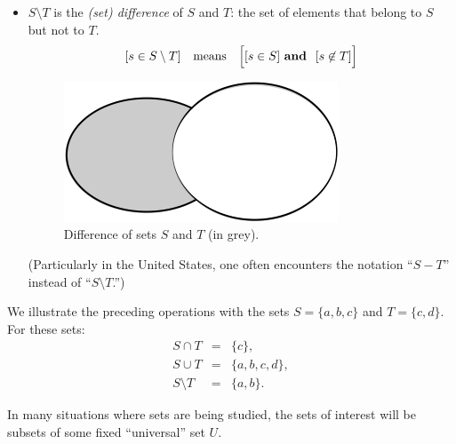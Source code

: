 \begin{itemize}
\begin{figure}[htb]
\begin{center}
        \label{fig:setUnion}
\end{center}
\end{figure}
\item
$S \setminus T$ is the {\em
  (set) difference} of $S$ and
  $T$: the set of elements that belong to $S$ but not to $T$.
\[ [s \in S \setminus T] \ \ \mbox{ means } \ \
\Big[ [s \in S] \ \mbox{\bf and } \ [s \not\in T] \Big]
\]
\begin{figure}[htb]
\begin{center}
        \includegraphics[scale=0.4]{FiguresMaths/setDiff}
        \caption{Difference of sets $S$ and $T$ (in grey).}
        \label{fig:setDiff}
\end{center}
\end{figure}
(Particularly in the United States, one often encounters the notation
 ``$S-T$''\index{$S - T$: set difference} instead of ``$S \setminus
 T$.'')
\end{itemize}

We illustrate the preceding operations with the sets $S = \{a,b,c\}$
and $T = \{c,d\}$.  For these sets:
\begin{eqnarray*}
S \cap T & = &  \{c\}, \\
S \cup T & = & \{a,b,c,d\}, \\
S \setminus T & = & \{a,b\}.
\end{eqnarray*}

In many situations where sets are being studied, the sets of interest
will be subsets of some fixed ``universal'' set
$U$.

\bigskip

\noindent {}
\bigskip

